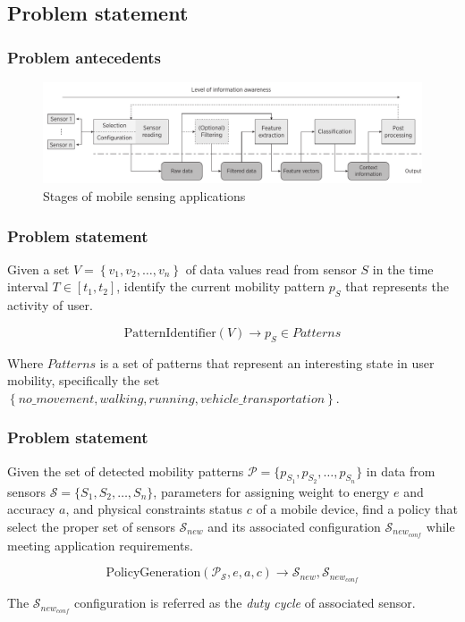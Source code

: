 \documentclass[compress,9pt,xcolor={dvipsnames,table}]{beamer}
\begin{document}
\subsection{Problem statement}
\begin{frame}[t]\frametitle{Problem antecedents}
\begin{figure}[tb]
  \centering
  \includegraphics[width=\textwidth]{../../../resources/images/vectors/msa-stages}
  \caption{Stages of mobile sensing applications}
  \label{fig:msa-stages}
\end{figure}
\end{frame}

\begin{frame}\frametitle{Problem statement}
\begin{tcolorbox}[title=Problem statement: Mobility pattern identification,colframe=PineGreen]
\small
Given a set $V = \left\{v_{1}, v_{2}, \dotsc, v_{n}\right\}$ of data values read from sensor $S$ in the time interval $T  \in [t_{1}, t_{2}]$, identify the current mobility pattern $p_{S}$ that represents the activity of user.

\begin{equation}
  \text{PatternIdentifier}( V ) \longrightarrow{} p_{S} \in Patterns
\end{equation}

Where $Patterns$ is a set of patterns that represent an interesting state in user mobility, specifically the set $\left\{no\_movement, walking, running, vehicle\_transportation\right\}$.
\end{tcolorbox}
\end{frame}

\begin{frame}\frametitle{Problem statement}
\begin{tcolorbox}[title=Problem statement: Policy generation,colframe=PineGreen]
\small
Given the set of detected mobility patterns $\mathcal{P} = \{ p_{S_1}, p_{S_2}, \ldots, p_{S_n} \}$ in data from sensors $\mathcal{S} = \{ S_1,S_2,\ldots, S_n \}$, parameters for assigning weight to energy $e$ and accuracy $a$, and physical constraints status $c$ of a mobile device, find a policy that select the proper set of sensors $\mathcal{S}_{new}$ and its associated configuration $\mathcal{S}_{new_{conf}}$  while meeting application requirements.

\begin{equation}
  \text{PolicyGeneration}( \mathcal{P}_{\mathcal{S}}, e, a, c ) \longrightarrow{} \mathcal{S}_{new}, \mathcal{S}_{new_{conf}}
\end{equation}

The $\mathcal{S}_{new_{conf}}$ configuration is referred as the \emph{duty cycle} of associated sensor.
\end{tcolorbox}
\end{frame}
\end{document}
